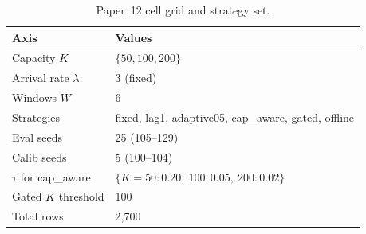 \begin{table}[!t]
  \caption{Paper~12 cell grid and strategy set.}
  \label{tab:grid}
  \centering
  \small
  \setlength{\tabcolsep}{4pt}
  \begin{tabular}{@{}p{2.8cm}p{4.7cm}@{}}
    \toprule
    \textbf{Axis} & \textbf{Values} \\
    \midrule
    Capacity $K$ & $\{50, 100, 200\}$ \\
    Arrival rate $\lambda$ & 3 (fixed) \\
    Windows $W$ & 6 \\
    Strategies & fixed, lag1, adaptive05, cap\_aware, gated, offline \\
    Eval seeds & 25 (105--129) \\
    Calib seeds & 5 (100--104) \\
    $\tau$ for cap\_aware & $\{K{=}50: 0.20,\ 100: 0.05,\ 200: 0.02\}$ \\
    Gated $K$ threshold & 100 \\
    \midrule
    Total rows & 2{,}700 \\
    \bottomrule
  \end{tabular}
\end{table}
